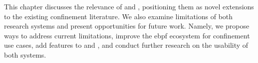 This chapter discusses the relevance of \bpfbox{} and \bpfcontain{}, positioning them as
novel extensions to the existing confinement literature. We also examine
limitations of both research systems and present opportunities for future work. Namely, we
propose ways to address current limitations, improve the \gls{ebpf} ecosystem for
confinement use cases, add features to \bpfbox{} and \bpfcontain{}, and conduct further
research on the usability of both systems.


